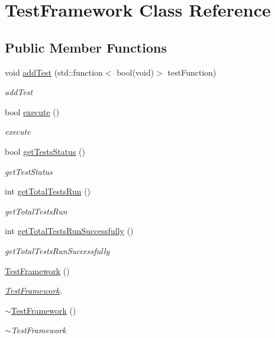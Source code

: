 \hypertarget{class_test_framework}{}\section{Test\+Framework Class Reference}
\label{class_test_framework}
\subsection*{Public Member Functions}
\begin{DoxyCompactItemize}
\item 
void \hyperlink{class_test_framework_a4f37e58d8b67f9da66372cf43f4281ae}{add\+Test} (std\+::function$<$ bool(void)$>$ test\+Function)
\begin{DoxyCompactList}\small\item\em add\+Test \end{DoxyCompactList}\item 
bool \hyperlink{class_test_framework_ace2588c0b0043546abc584b1d1b08e96}{execute} ()
\begin{DoxyCompactList}\small\item\em execute \end{DoxyCompactList}\item 
bool \hyperlink{class_test_framework_ae12aac94ee9a745eb3ce46f5d003dcf2}{get\+Tests\+Status} ()
\begin{DoxyCompactList}\small\item\em get\+Test\+Status \end{DoxyCompactList}\item 
int \hyperlink{class_test_framework_ad35b7b750378155531cf65e8163b67dd}{get\+Total\+Tests\+Run} ()
\begin{DoxyCompactList}\small\item\em get\+Total\+Tests\+Run \end{DoxyCompactList}\item 
int \hyperlink{class_test_framework_a34508c693cf7a3be01a3975065fa2457}{get\+Total\+Tests\+Run\+Successfully} ()
\begin{DoxyCompactList}\small\item\em get\+Total\+Tests\+Run\+Successfully \end{DoxyCompactList}\item 
\hyperlink{class_test_framework_a80e30a085718a9e3db4e6f4e79cc9d48}{Test\+Framework} ()
\begin{DoxyCompactList}\small\item\em \hyperlink{class_test_framework}{Test\+Framework}. \end{DoxyCompactList}\item 
\hyperlink{class_test_framework_aad3d6888fe40a083e767061a1ebf0c1d}{$\sim$\+Test\+Framework} ()
\begin{DoxyCompactList}\small\item\em $\sim$\+Test\+Framework \end{DoxyCompactList}\end{DoxyCompactItemize}


